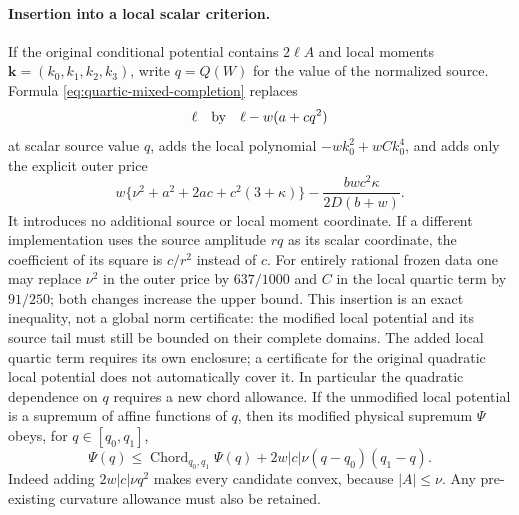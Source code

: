 \paragraph{Insertion into a local scalar criterion.}
If the original conditional potential contains $2\ell A$ and local
moments $\mathbf k=(k_0,k_1,k_2,k_3)$, write $q=Q(W)$ for the value
of the normalized source.  Formula
\eqref{eq:quartic-mixed-completion} replaces
\[
 \ell\quad\hbox{by}\quad\ell-w(a+cq^2)
\]
at scalar source value $q$, adds the local polynomial
$-wk_0^2+wCk_0^4$, and adds only the explicit outer price
\[
 w\{\nu^2+a^2+2ac+c^2(3+\kappa)\}
 -\frac{bw c^2\kappa}{2D(b+w)}.
\]
It introduces no additional source or local moment coordinate.  If a
different implementation uses the source amplitude $rq$ as its scalar
coordinate, the coefficient of its square is $c/r^2$ instead of $c$.
For entirely rational frozen data one may replace $\nu^2$ in the outer
price by $637/1000$ and $C$ in the local quartic term by $91/250$;
both changes increase the upper bound.
This insertion is an exact inequality, not a global norm certificate:
the modified local potential and its source tail must still be bounded
on their complete domains.  The added local quartic term requires its
own enclosure; a certificate for the original quadratic local potential
does not automatically cover it.  In particular the quadratic dependence
on $q$ requires a new chord allowance.  If the unmodified local
potential is a supremum of affine functions of $q$, then its modified
physical supremum $\Psi$ obeys, for $q\in[q_0,q_1]$,
\[
 \Psi(q)\leq\operatorname{Chord}_{q_0,q_1}\Psi(q)
       +2w|c|\nu(q-q_0)(q_1-q).
\]
Indeed adding $2w|c|\nu q^2$ makes every candidate convex, because
$|A|\leq\nu$.  Any pre-existing curvature allowance must also be retained.
